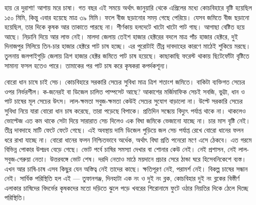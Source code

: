 \documentclass{article}
\begin{document}
\begin{minipage}[t]{118mm}
\begin{multicols}{2}
হায় রে দুরাশা! আশায় মরে চাষা। গত বছর এই সময়ে অর্থাৎ জানুয়ারি থেকে এপ্রিলের মধ্যে কোচবিহারে বৃষ্টি হয়েছিল ১৫০ মিমি, কিন্তু এবার হয়েছে মাত্র ৩৯ মিমি। ফলে বীজ ছড়ানোর সময় গেছে পেরিয়ে। যেসব জমিতে বীজ ছড়ানো হয়েছিল, তার দিকে কৃষক আর তাকাতে পারছে না। শীর্ণকায় হলদেটে খাটো খাটো পাট গাছ। আগাছা বেষ্টিত হয়ে আছে। নিড়ানি দিয়ে আর লাভ নেই। মালদা জেলায় তেইশ হাজার হেক্টরের বদলে মাত্র পাঁচ হাজার হেক্টরে, দুই দিনাজপুর মিলিয়ে তিন-চার হাজার হেক্টরে পাট চাষ হচ্ছে। এর পুরোটাই তীব্র দাবদাহের কারণে মাঠেই শুকিয়ে মরছে। তুলনায় জলপাইগুড়ি জেলায় ত্রিশ হাজার হেক্টর জমিতে পাট চাষ হয়েছে। কাছাকাছি ফরেস্ট থাকায় ছিটেফোঁটা বৃষ্টিতে সামান্য ফসল হতেও পারে। তামাকের পর পাট চাষ করে কৃষকরা কপর্দকশূন্য। 

বোরো ধান চাষে চাই সেচ। কোচবিহারে সরকারি সেচের সুবিধা মাত্র ত্রিশ শতাংশ জমিতে। বাকিটা ব্যক্তিগত সেচের ওপর নির্ভরশীল। ক-জনেরই বা ডিজেল চালিত পাম্পসেট আছে? আকাশের মর্জিমাফিক সেচই সবজি, ভুট্টা, ধান ও পাট চাষের মূল সেচের উৎস। লাল-ক্ষমতা সবুজ-ক্ষমতা কেউই সেচের সুযোগ বাড়ালো না। উল্টে সরকারি সেচের সুবিধা নিয়ে যারা বোরো ধান চাষ করেছে, তারা পড়েছে বিপাকে। প্রতিদিন সন্ধ্যেয় বিদ্যুৎ পর্যাপ্ত থাকে না। থাকলেও ভোল্টেজ এত কম থাকে সেটা দিয়ে সারারাত সেচ দিলেও এক বিঘা জমিকে ভেজানো যাচ্ছে না। চার মাস বৃষ্টি নেই। তীব্র দাবদাহে মাটি ফেটে ফেটে গেছে। এই অবস্থায় দামি ডিজেল পুড়িয়ে জল সেচ পর্যাপ্ত রেখে বোরো ধানের ফলন ধরে রাখা যাচ্ছে না। বোরো ধানের ফলন নিশ্চিতভাবে অর্ধেক, অর্থাৎ বিঘা প্রতি পনেরো মণে এসে ঠেকবে। এত গরমে বিভিন্ন পোকার উপদ্রব বেড়ে গেছে। ভোট পর্বে চাষির সমস্যা দেখার বা শোনার কেউ নেই। নেই প্রশাসন, নেই লাল-সবুজ-গেরুয়া নেতা। উত্তরবঙ্গে ভোট শেষ। দরদি নেতাও মাঠে ময়দানে প্রচার সেরে ঠান্ডা ঘরে হিসেবনিকেশে ব্যস্ত। এখন আর চাষি-চাষ এসব কিছুর যেন অস্তিত্ব নেই তাদের কাছে। ক্ষতিপূরণ নেই, পরামর্শ নেই। বিকল্প চাষের সন্ধান নেই। সার্বিক পরিস্থিতি হল এই --- তুফানগঞ্জ, দিনহাটা এক নং ও দুই নং ব্লক, কোচবিহার দুই নং ব্লকের বিস্তীর্ণ এলাকার চাষিদের বিদর্ভের কৃষকদের মতো দড়িতে ঝুলে পড়ে খবরের শিরোনামে ফুটে ওঠার নিয়তির দিকে ঠেলে দিচ্ছে পরিস্থিতি। 
\end{multicols}
%
\end{minipage}
%
\end{document}
